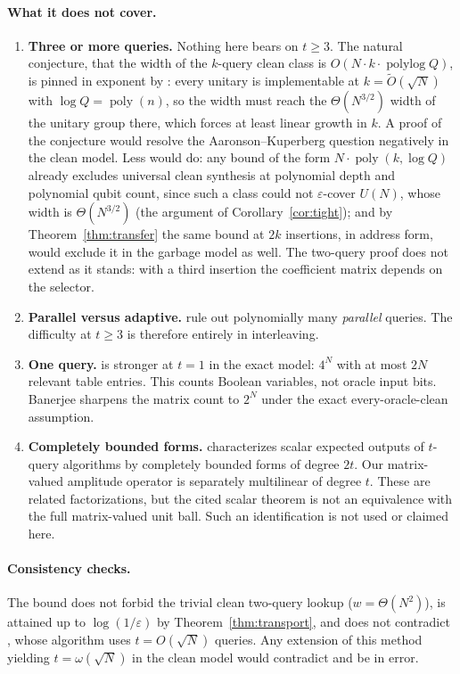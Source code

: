 \documentclass[11pt,a4paper]{article}
\theoremstyle{plain}
\theoremstyle{definition}
\theoremstyle{remark}
\DeclareMathOperator{\polylog}{polylog}
\DeclareMathOperator{\poly}{poly}
\begin{document}
\paragraph{What it does not cover.}
\begin{enumerate}[leftmargin=*]
\item \textbf{Three or more queries.} Nothing here bears on $t\ge3$. The natural conjecture,
that the width of the $k$-query clean class is $O(N\cdot k\cdot\polylog Q)$, is pinned in
exponent by \cite{Ros26}: every unitary is implementable at $k=\tilde O(\sqrt N)$ with
$\log Q=\poly(n)$, so the width must reach the $\Theta(N^{3/2})$ width of the unitary group
there, which forces at least linear growth in $k$. A proof of the conjecture would resolve
the Aaronson--Kuperberg question negatively in the clean model. Less would do: any bound of the form
$N\cdot\poly(k,\log Q)$ already excludes universal clean synthesis at polynomial depth and
polynomial qubit count, since such a class could not $\varepsilon$-cover $U(N)$, whose width
is $\Theta(N^{3/2})$ (the argument of Corollary~\ref{cor:tight}); and by
Theorem~\ref{thm:transfer} the same bound at $2k$ insertions, in address form, would exclude
it in the garbage model as well. The two-query proof does not extend as it stands: with a
third insertion the coefficient matrix depends on the selector.
\item \textbf{Parallel versus adaptive.} \cite{LMW24} rule out polynomially many
\emph{parallel} queries. The difficulty at $t\ge3$ is therefore entirely in interleaving.
\item \textbf{One query.} \cite[Thm~6.7]{AK07} is stronger at $t=1$ in the exact model: $4^N$
with at most $2N$ relevant table entries. This counts Boolean variables, not oracle
input bits. Banerjee \cite{Ban25} sharpens the matrix count to $2^N$ under the
exact every-oracle-clean assumption.
\item \textbf{Completely bounded forms.} \cite[Thm~1.3]{ABP18} characterizes scalar expected
outputs of $t$-query algorithms by completely bounded forms of degree $2t$.
Our matrix-valued amplitude operator is separately multilinear of degree $t$.
These are related factorizations, but the cited scalar theorem is not an equivalence
with the full matrix-valued unit ball. Such an identification is not used or claimed here.
\end{enumerate}

\paragraph{Consistency checks.} The bound does not forbid the trivial clean two-query lookup
($w=\Theta(N^2)$), is attained up to $\log(1/\varepsilon)$ by Theorem~\ref{thm:transport}, and
does not contradict \cite{Ros26}, whose algorithm uses $t=O(\sqrt N)$ queries. Any extension
of this method yielding $t=\omega(\sqrt N)$ in the clean model would contradict \cite{Ros26}
and be in error.
\end{document}
